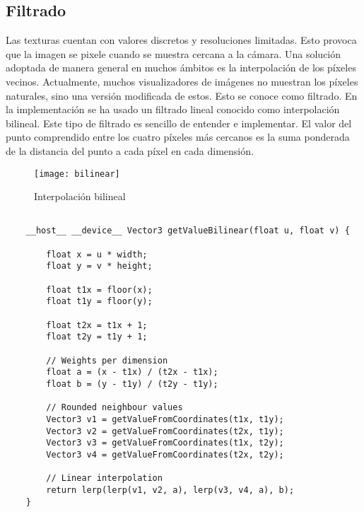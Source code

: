 \subsection{Filtrado}
			
Las texturas cuentan con valores discretos y resoluciones limitadas. Esto provoca que la imagen se pixele cuando se muestra cercana a la cámara. Una solución adoptada de manera general en muchos ámbitos es la interpolación de los píxeles vecinos. Actualmente, muchos visualizadores de imágenes no muestran los píxeles naturales, sino una versión modificada de estos. Esto se conoce como filtrado. En la implementación se ha usado un filtrado lineal conocido como interpolación bilineal. Este tipo de filtrado es sencillo de entender e implementar. El valor del punto  comprendido entre los cuatro píxeles más cercanos  es la suma ponderada de la distancia del punto a cada píxel en cada dimensión.
	
\begin{figure}[H]
	\label{fig:bilinear}
	\centering
	\texttt{[image: bilinear]}
	\caption{Interpolación bilineal}
\end{figure}
	
\begin{minipage}[c]{0.95\textwidth}
\begin{lstlisting}[label={cod:bilinear}, caption={Código interpolación bilinear}]
	
	__host__ __device__ Vector3 getValueBilinear(float u, float v) {
        
        float x = u * width;
        float y = v * height;

        float t1x = floor(x);
        float t1y = floor(y);

        float t2x = t1x + 1;
        float t2y = t1y + 1;

		// Weights per dimension
        float a = (x - t1x) / (t2x - t1x);
        float b = (y - t1y) / (t2y - t1y);

		// Rounded neighbour values
        Vector3 v1 = getValueFromCoordinates(t1x, t1y);
        Vector3 v2 = getValueFromCoordinates(t2x, t1y);
        Vector3 v3 = getValueFromCoordinates(t1x, t2y);
        Vector3 v4 = getValueFromCoordinates(t2x, t2y);

		// Linear interpolation
        return lerp(lerp(v1, v2, a), lerp(v3, v4, a), b);
	}
\end{lstlisting}
\end{minipage}	


